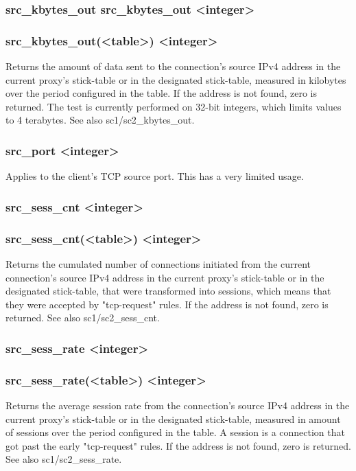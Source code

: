 \subsubsection[src\_kbytes\_out]{src\_kbytes\_out src\_kbytes\_out <integer>}
\subsubsection*{src\_kbytes\_out(<table>) <integer>}
  Returns the amount of data sent to the connection's source IPv4 address in
  the current proxy's stick-table or in the designated stick-table, measured
  in kilobytes over the period configured in the table. If the address is not
  found, zero is returned. The test is currently performed on 32-bit integers,
  which limits values to 4 terabytes. See also sc1/sc2\_kbytes\_out.

\subsubsection[src\_port]{src\_port <integer>}
  Applies to the client's TCP source port. This has a very limited usage.

\subsubsection[src\_sess\_cnt]{src\_sess\_cnt <integer>}
\subsubsection*{src\_sess\_cnt(<table>) <integer>}
  Returns the cumulated number of connections initiated from the current
  connection's source IPv4 address in the current proxy's stick-table or in the
  designated stick-table, that were transformed into sessions, which means that
  they were accepted by "tcp-request" rules. If the address is not found, zero
  is returned. See also sc1/sc2\_sess\_cnt.

\subsubsection[src\_sess\_rate]{src\_sess\_rate <integer>}
\subsubsection*{src\_sess\_rate(<table>) <integer>}
  Returns the average session rate from the connection's source IPv4 address in
  the current proxy's stick-table or in the designated stick-table, measured in
  amount of sessions over the period configured in the table. A session is a
  connection that got past the early "tcp-request" rules. If the address is not
  found, zero is returned. See also sc1/sc2\_sess\_rate.

